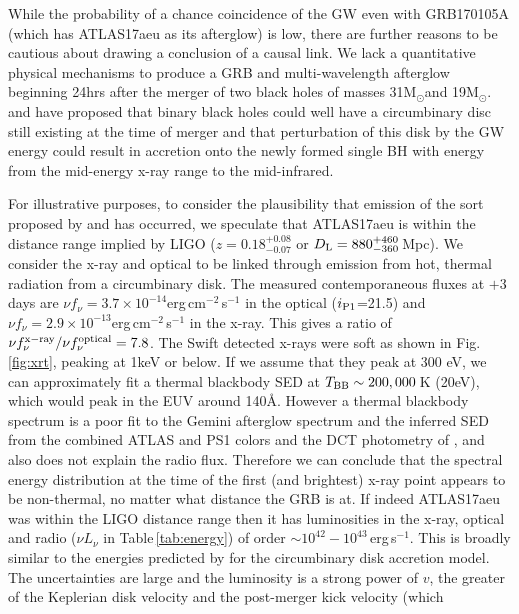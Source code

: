 \documentclass[twocolumn]{aastex61}
\newcommand{\ips}{\ensuremath{i_{\rm P1}}}
\newcommand{\msun}{\mbox{M$_{\odot}$}}
\def\ergcm2s{erg\,cm$^{-2}$\,s$^{-1}$}
\begin{document}
While the probability of a chance coincidence of the GW even with GRB170105A
(which has ATLAS17aeu as its afterglow) is low, there 
are further reasons 
to be cautious about drawing a conclusion of a causal link. 
We lack a quantitative 
physical mechanisms to  
produce a GRB and multi-wavelength afterglow beginning 24hrs after the 
merger of two black holes of masses 31\msun and 19\msun. \cite{2016ApJ...821L..18P} and \cite{2017ApJ...839L...7D} have proposed that binary black holes 
could well have a circumbinary disc still existing at the time of merger and 
that perturbation of this disk by the GW energy could result in accretion onto 
the newly formed single BH with energy from the mid-energy x-ray range to the
mid-infrared. 


For illustrative purposes, to consider the plausibility that emission of 
the sort proposed by \cite{2016ApJ...821L..18P} and \cite{2017ApJ...839L...7D} has occurred, we 
speculate that ATLAS17aeu is within the distance range implied by 
LIGO ($z = 0.18^{+0.08}_{-0.07}$ or $D_{\rm L} = 880^{+460}_{-360}$\,Mpc). 
We consider the x-ray and optical to be linked through 
emission from hot, thermal radiation from a circumbinary disk. 
The measured contemporaneous fluxes at $+3$days are
$\nu f_{\nu}=3.7\times10^{-14}$\ergcm2s in the optical (\ips=21.5)
and 
$\nu f_{\nu}=2.9\times10^{-13}$\ergcm2s in the x-ray.
This gives a ratio of 
$\nu f_{\nu}^{\rm x-ray}/\nu f_{\nu}^{\rm optical}= 7.8$. 
The Swift detected x-rays were soft as shown in Fig.\,\ref{fig:xrt}, 
peaking at 1keV or below. 
If we assume that they peak at 300 eV, 
we can approximately fit a thermal blackbody SED 
at $T_{\rm BB} \sim 200,000$\,K (20eV), which would peak in the EUV around 140\AA. 
However a thermal blackbody 
spectrum is a poor fit to the Gemini afterglow spectrum and the 
inferred SED from the combined ATLAS and PS1 colors and the DCT 
photometry of \cite{GCN20397}, and also does not explain the radio flux. 
Therefore we can conclude that the spectral 
energy distribution at the time of the first (and brightest) x-ray 
point appears to be non-thermal, no matter what distance the GRB
is at.  If  indeed ATLAS17aeu was within the LIGO distance 
range then it has luminosities in the x-ray, optical and 
radio ($\nu L_\nu$ in Table\,\ref{tab:energy}) of order $\sim10^{42}-10^{43}$\,erg\,s$^{-1}$. 
This is broadly similar to the energies predicted by \cite{2017ApJ...839L...7D}
for the circumbinary disk accretion model. The uncertainties are large 
and the luminosity is a strong power of $v$, the greater of the 
Keplerian disk velocity and the post-merger kick velocity (which 
\end{document}
